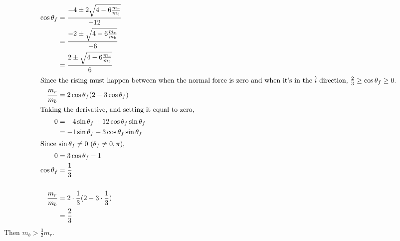 \documentclass[solutions]{esg8012pset}
\renewcommand{\d}{\,d}
\begin{document}
\begin{enumerate}[a)]
\begin{align*}
    \cos\theta_f & = \frac{-4 \pm 2\sqrt{4-6\frac{m_r}{m_b}}}{-12} \\
     & = \frac{-2 \pm \sqrt{4-6\frac{m_r}{m_b}}}{-6} \\
     & = \frac{2 \pm \sqrt{4-6\frac{m_r}{m_b}}}{6} \\
\intertext{Since the rising must happen between when the normal force is zero and when it's in the $\hat i$ direction, $\frac{2}{3} \geq \cos\theta_f \geq 0$.}
    \frac{m_r}{m_b} & = 2\cos\theta_f(2 - 3\cos\theta_f) \\
\intertext{Taking the derivative, and setting it equal to zero,}
    0 & = -4\sin\theta_f + 12\cos\theta_f\sin\theta_f \\
      & = -1\sin\theta_f + 3\cos\theta_f\sin\theta_f \\
\intertext{Since $\sin\theta_f \neq 0$ ($\theta_f\neq 0, \pi$),}
    0 & = 3\cos\theta_f - 1 \\
    \cos\theta_f & = \frac{1}{3} \\
    \\
    \frac{m_r}{m_b} & = 2\cdot\frac{1}{3}(2 - 3\cdot\frac{1}{3}) \\
     & = \frac{2}{3} \\
   \end{align*}
   Then $m_b > \frac{3}{2}m_r$.

\end{enumerate}
\end{document}
